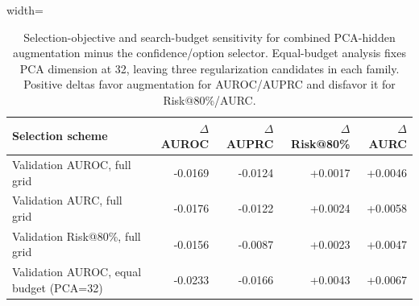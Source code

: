 \begin{table}[t]
\centering
\small
\caption{Selection-objective and search-budget sensitivity for combined PCA-hidden augmentation minus the confidence/option selector. Equal-budget analysis fixes PCA dimension at 32, leaving three regularization candidates in each family. Positive deltas favor augmentation for AUROC/AUPRC and disfavor it for Risk@80\%/AURC.}
\label{tab:selection-sensitivity}
\begin{adjustbox}{width=\textwidth}
\begin{tabular}{lrrrr}
\toprule
Selection scheme & $\Delta$ AUROC & $\Delta$ AUPRC & $\Delta$ Risk@80\% & $\Delta$ AURC \\
\midrule
Validation AUROC, full grid & -0.0169 & -0.0124 & +0.0017 & +0.0046 \\
Validation AURC, full grid & -0.0176 & -0.0122 & +0.0024 & +0.0058 \\
Validation Risk@80\%, full grid & -0.0156 & -0.0087 & +0.0023 & +0.0047 \\
Validation AUROC, equal budget (PCA=32) & -0.0233 & -0.0166 & +0.0043 & +0.0067 \\
\bottomrule
\end{tabular}
\end{adjustbox}
\end{table}
